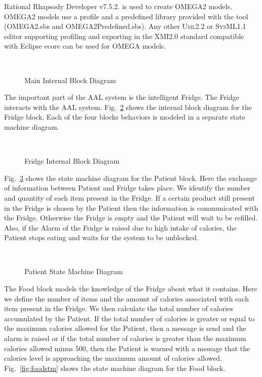 \documentclass[a4paper,twoside]{article}
\def\sysml{\textsc{SysML}}
\def\uml{\textsc{Uml}}
\begin{document}
Rational Rhapsody Developer v7.5.2. \cite{test16} is used to create OMEGA2 models. OMEGA2 models use a profile and a predefined library provided with the tool (OMEGA2.sbs and OMEGA2Predefined.sbs). Any other \uml{}2.2 or \sysml{}1.1 editor supporting profiling and exporting in the XMI2.0 standard compatible with Eclipse ecore can be used for OMEGA models.

\begin{figure}[!h]
  \vspace{8cm}~
  \centering
  {}
  \caption{Main Internal Block Diagram}
  \label{fig:mainibd}
 \end{figure}
 
The important part of the AAL system is the intelligent Fridge. The Fridge interacts with the AAL system. Fig.~\ref{fig:fridgeibd} shows the internal block diagram for the Fridge block. Each of the four blocks behaviors is modeled in a separate state machine diagram.

\begin{figure}[!h]
  \vspace{8cm}~
  \centering
  {}
  \caption{Fridge Internal Block Diagram}
  \label{fig:fridgeibd}
 \end{figure}
 
Fig.~\ref{fig:patientstm} shows the state machine diagram for the Patient block. Here the exchange of information between Patient and Fridge takes place. We identify the number and quantity of each item present in the Fridge. If a certain product still present in the Fridge is chosen by the Patient then the information is  communicated with the Fridge.  Otherwise the Fridge is empty and the Patient will wait to be refilled. Also, if the Alarm of the Fridge is raised due to  high intake of calories, the Patient stops eating and waits for the system to be unblocked.
 
\begin{figure}[!h]
  \vspace{8cm}~
  \centering
  {}
  \caption{Patient State Machine Diagram}
  \label{fig:patientstm}
 \end{figure}
 
The Food block models the knowledge of the Fridge about what it contains. Here we define the number of items and the amount of calories associated with each item present in the Fridge. We then calculate the total number of calories accumulated by the Patient. If the total number of calories is greater or equal to the maximum calories allowed for the Patient, then a message is send and the alarm is raised or if the total number of calories is greater than the maximum calories allowed minus 500, then the Patient is warned with a message that the calories level is approaching the maximum amount of calories allowed. Fig.~\ref{fig:foodstm} shows the state machine diagram for the Food block.
\end{document}
